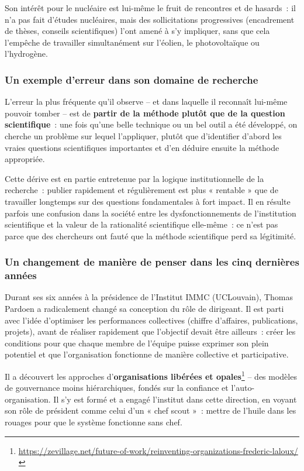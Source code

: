 Son intérêt pour le nucléaire est lui-même le fruit de rencontres et de hasards~: il n'a pas fait d'études nucléaires, mais des sollicitations progressives (encadrement de thèses, conseils scientifiques) l'ont amené à s'y impliquer, sans que cela l'empêche de travailler simultanément sur l'éolien, le photovoltaïque ou l'hydrogène.

\subsubsection{Un exemple d'erreur dans son domaine de recherche}

L'erreur la plus fréquente qu'il observe -- et dans laquelle il reconnaît lui-même pouvoir tomber -- est de \textbf{partir de la méthode plutôt que de la question scientifique}~: une fois qu'une belle technique ou un bel outil a été développé, on cherche un problème sur lequel l'appliquer, plutôt que d'identifier d'abord les vraies questions scientifiques importantes et d'en déduire ensuite la méthode appropriée.

Cette dérive est en partie entretenue par la logique institutionnelle de la recherche~: publier rapidement et régulièrement est plus « rentable » que de travailler longtemps sur des questions fondamentales à fort impact. Il en résulte parfois une confusion dans la société entre les dysfonctionnements de l'institution scientifique et la valeur de la rationalité scientifique elle-même~: ce n'est pas parce que des chercheurs ont fauté que la méthode scientifique perd sa légitimité.

\subsubsection{Un changement de manière de penser dans les cinq dernières années}

Durant ses six années à la présidence de l'Institut IMMC (UCLouvain), Thomas Pardoen a radicalement changé sa conception du rôle de dirigeant. Il est parti avec l'idée d'optimiser les performances collectives (chiffre d'affaires, publications, projets), avant de réaliser rapidement que l'objectif devait être ailleurs~: créer les conditions pour que chaque membre de l'équipe puisse exprimer son plein potentiel et que l'organisation fonctionne de manière collective et participative.

Il a découvert les approches d'\textbf{organisations libérées et opales}\footnote{\url{https://zevillage.net/future-of-work/reinventing-organizations-frederic-laloux/}} -- des modèles de gouvernance moins hiérarchiques, fondés sur la confiance et l'auto-organisation. Il s'y est formé et a engagé l'institut dans cette direction, en voyant son rôle de président comme celui d'un « chef scout »~: mettre de l'huile dans les rouages pour que le système fonctionne sans chef.

